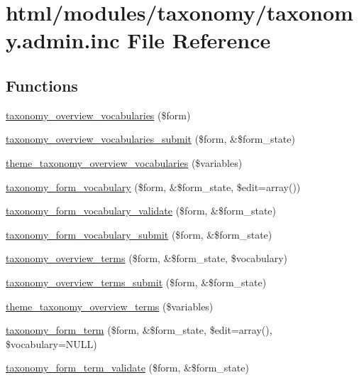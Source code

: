 \hypertarget{taxonomy_8admin_8inc}{
\section{html/modules/taxonomy/taxonomy.admin.inc File Reference}
\label{taxonomy_8admin_8inc}
}
\subsection*{Functions}
\begin{DoxyCompactItemize}
\item 
\hyperlink{group__forms_ga4509184b09d51fc6f3cccbd883cbd4f8}{taxonomy\_\-overview\_\-vocabularies} (\$form)
\item 
\hyperlink{taxonomy_8admin_8inc_a2c0c58c11c7f85fa38bab165004f98e2}{taxonomy\_\-overview\_\-vocabularies\_\-submit} (\$form, \&\$form\_\-state)
\item 
\hyperlink{group__themeable_ga8037235a6d606e3f579783845327fdc0}{theme\_\-taxonomy\_\-overview\_\-vocabularies} (\$variables)
\item 
\hyperlink{group__forms_gafb93f170208a8c9c125b31ac91e1f966}{taxonomy\_\-form\_\-vocabulary} (\$form, \&\$form\_\-state, \$edit=array())
\item 
\hyperlink{taxonomy_8admin_8inc_afab98304eee771ced13ea3999aa8c5b4}{taxonomy\_\-form\_\-vocabulary\_\-validate} (\$form, \&\$form\_\-state)
\item 
\hyperlink{taxonomy_8admin_8inc_a5fe8d2d826372a29a068cd2c39e38636}{taxonomy\_\-form\_\-vocabulary\_\-submit} (\$form, \&\$form\_\-state)
\item 
\hyperlink{group__forms_gac5a4ddd2115e830118c10b98f464a4ab}{taxonomy\_\-overview\_\-terms} (\$form, \&\$form\_\-state, \$vocabulary)
\item 
\hyperlink{taxonomy_8admin_8inc_afb672457712a0a215cdeaa91748b4517}{taxonomy\_\-overview\_\-terms\_\-submit} (\$form, \&\$form\_\-state)
\item 
\hyperlink{group__themeable_gabcead84347c45b0e1316953ab53bf3ad}{theme\_\-taxonomy\_\-overview\_\-terms} (\$variables)
\item 
\hyperlink{group__forms_gadd038edd60ebd00177106bb97841803c}{taxonomy\_\-form\_\-term} (\$form, \&\$form\_\-state, \$edit=array(), \$vocabulary=NULL)
\item 
\hyperlink{taxonomy_8admin_8inc_ab8a69acec84eb6217604c066b33deab1}{taxonomy\_\-form\_\-term\_\-validate} (\$form, \&\$form\_\-state)

\end{DoxyCompactItemize}
